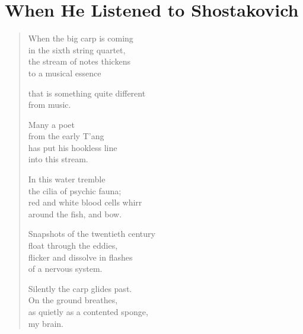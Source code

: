 {\setlength{\stanzaskip}{0.5em}

\section{When He Listened to Shostakovich}

\vspace*{-\onelineskip}
\begin{verse}

When the big carp is coming\\
in the sixth string quartet,\\
the stream of notes thickens\\
to a musical essence

that is something quite different\\
from music.

Many a poet\\
from the early T'ang\\
has put his hookless line\\
into this stream.

In this water tremble\\
the cilia of psychic fauna;\\
red and white blood cells whirr\\
around the fish, and bow.

Snapshots of the twentieth century\\
float through the eddies,\\
flicker and dissolve in flashes\\
of a nervous system.

Silently the carp glides past.\\
On the ground breathes,\\
as quietly as a contented sponge,\\
my brain.

\end{verse}

}

